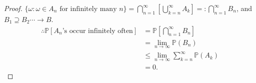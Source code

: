 \documentclass[12pt]{report}
\renewcommand{\P}{\mathbb{P}}
\renewcommand{\1}{\mathbb{1}}
\renewcommand{\supset}{\supseteq}
\theoremstyle{break}
\theoremstyle{newdef}
\theoremstyle{remark}
\begin{document}
\begin{proof}
$\{\omega: \omega\in A_n \text{ for infinitely many } n\}
= \bigcap_{n=1}^\infty\left[\bigcup_{k=n}^\infty A_k\right]
=: \bigcap_{n=1}^\infty B_n$, and $B_1 \supset B_2 \cdots \rightarrow B$.
$$
\begin{aligned}
\therefore
\P\left[ A_n\text{'s occur infinitely often}\right]
&= \P[\bigcap_{n=1}^\infty B_n]\\
&= \lim_{n\rightarrow\infty} \P(B_n)\\
&\leq \lim_{n\rightarrow\infty}\sum_{k=n}^\infty \P(A_k)\\
&= 0.
\end{aligned}
$$
\end{proof}

























































\end{document}
